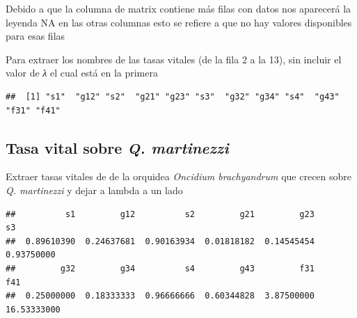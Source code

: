 \documentclass[
]{book}
\newenvironment{Shaded}{\begin{snugshade}}{\end{snugshade}}
\newcommand{\CommentTok}[1]{\textcolor[rgb]{0.56,0.35,0.01}{\textit{#1}}}
\newcommand{\DecValTok}[1]{\textcolor[rgb]{0.00,0.00,0.81}{#1}}
\newcommand{\FunctionTok}[1]{\textcolor[rgb]{0.13,0.29,0.53}{\textbf{#1}}}
\newcommand{\NormalTok}[1]{#1}
\newcommand{\OtherTok}[1]{\textcolor[rgb]{0.56,0.35,0.01}{#1}}
\newcommand{\SpecialCharTok}[1]{\textcolor[rgb]{0.81,0.36,0.00}{\textbf{#1}}}
\theoremstyle{definition}
\theoremstyle{definition}
\theoremstyle{definition}
\theoremstyle{definition}
\theoremstyle{remark}
\begin{document}
Debido a que la columna de matrix contiene más filas con datos nos aparecerá la leyenda NA en las otras columnas esto se refiere a que no hay valores disponibles para esas filas

Para extraer los nombres de las tasas vitales (de la fila 2 a la 13), sin incluir el valor de \emph{λ} el cual está en la primera

\begin{Shaded}
\end{Shaded}

\begin{verbatim}
##  [1] "s1"  "g12" "s2"  "g21" "g23" "s3"  "g32" "g34" "s4"  "g43" "f31" "f41"
\end{verbatim}

\subsection{\texorpdfstring{Tasa vital sobre \emph{Q. martinezzi}}{Tasa vital sobre Q. martinezzi}}\label{tasa-vital-sobre-q.-martinezzi}

Extraer tasas vitales de de la orquidea \emph{Oncidium brachyandrum} que crecen sobre \emph{Q. martinezzi} y dejar a lambda a un lado

\begin{Shaded}
\end{Shaded}

\begin{verbatim}
##          s1         g12          s2         g21         g23          s3 
##  0.89610390  0.24637681  0.90163934  0.01818182  0.14545454  0.93750000 
##         g32         g34          s4         g43         f31         f41 
##  0.25000000  0.18333333  0.96666666  0.60344828  3.87500000 16.53333000
\end{verbatim}
\end{document}
